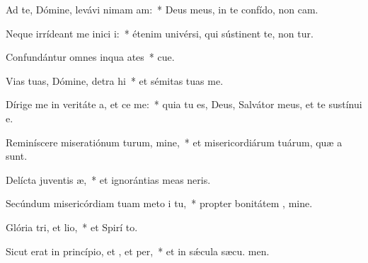 \item Ad te, Dómine, levávi nimam am:~* Deus meus, in te confído, non cam.
\item Neque irrídeant me inici i:~* étenim univérsi, qui sústinent te, non tur.
\item Confundántur omnes inqua ates~* cue.
\item Vias tuas, Dómine, detra hi~* et sémitas tuas  me.
\item Dírige me in veritáte a, et ce me:~* quia tu es, Deus, Salvátor meus, et te sustínui  e.
\item Reminíscere miseratiónum turum, mine,~* et misericordiárum tuárum, quæ a  sunt.
\item Delícta juventis æ,~* et ignorántias meas  neris.
\item Secúndum misericórdiam tuam meto i tu,~* propter bonitátem , mine.
\item Glória tri, et lio,~* et Spirí to.
\item Sicut erat in princípio, et , et per,~* et in sǽcula sæcu. men.
